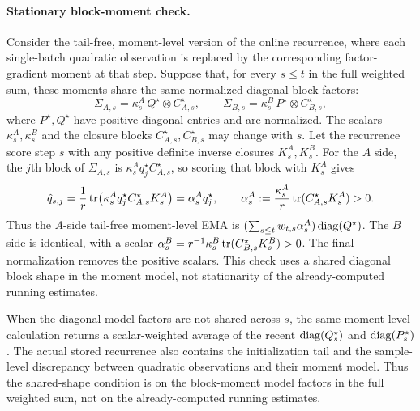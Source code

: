\paragraph{Stationary block-moment check.}\label{par:stationary-check-03}
Consider the tail-free, moment-level version of the online recurrence, where
each single-batch quadratic observation is replaced by the corresponding
factor-gradient moment at that step. Suppose that, for every $s\le t$ in the
full weighted sum, these moments share the same normalized diagonal block
factors:
\[
  \Sigma_{A,s}=\kappa^A_s\,Q^\star\otimes C^\star_{A,s},
  \qquad
  \Sigma_{B,s}=\kappa^B_s\,P^\star\otimes C^\star_{B,s},
\]
where $P^\star,Q^\star$ have positive diagonal entries and are normalized.
The scalars $\kappa^A_s,\kappa^B_s$ and the closure blocks
$C^\star_{A,s},C^\star_{B,s}$ may change with $s$. Let the recurrence score
step $s$ with any positive definite inverse closures $K^A_s,K^B_s$. For the
$A$ side, the $j$th block of $\Sigma_{A,s}$ is
$\kappa^A_s q^\star_j C^\star_{A,s}$, so scoring that block with $K^A_s$ gives
\[
  \hat q_{s,j}
  =
  \frac1r\operatorname{tr}\!\left(\kappa^A_s q^\star_j C^\star_{A,s}K^A_s\right)
  =
  \alpha^A_s q^\star_j,
  \qquad
  \alpha^A_s:=\frac{\kappa^A_s}{r}\operatorname{tr}(C^\star_{A,s}K^A_s)>0 .
\]
Thus the $A$-side tail-free moment-level EMA is
$(\sum_{s\le t}w_{t,s}\alpha^A_s)\operatorname{diag}(Q^\star)$. The $B$ side is identical,
with a scalar
$\alpha^B_s=r^{-1}\kappa^B_s\operatorname{tr}(C^\star_{B,s}K^B_s)>0$. The final
normalization removes the positive scalars. This check uses a shared diagonal
block shape in the moment model, not stationarity of the already-computed
running estimates.

When the diagonal model factors are not shared across $s$, the same
moment-level calculation returns a scalar-weighted average of the recent
$\operatorname{diag}(Q^\star_s)$ and $\operatorname{diag}(P^\star_s)$. The actual stored recurrence also
contains the initialization tail and the sample-level discrepancy between
quadratic observations and their moment model. Thus the shared-shape condition
is on the block-moment model factors in the full weighted sum, not on the
already-computed running estimates.

